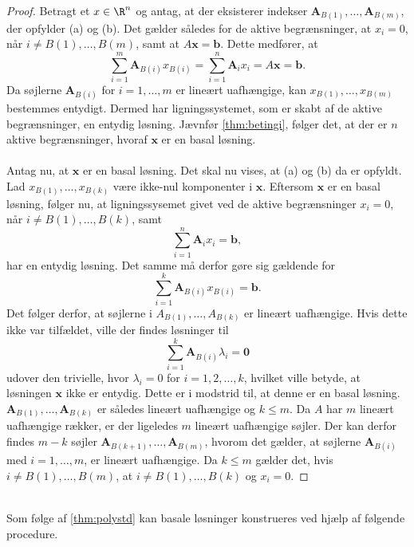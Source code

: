 \begin{proof}
Betragt et $x \in \R^n$ og antag, at der eksisterer indekser $\mathbf{A}_{B(1)},\ldots,\mathbf{A}_{B(m)}$, der opfylder (a) og (b).
%
Det gælder således for de aktive begrænsninger, at $x_i=0$, når $i\neq B(1),\ldots,B(m)$, samt at $A\textbf{x}=\mathbf{b}$.
Dette medfører, at 
%
$$\sum_{i=1}^{m}\textbf{A}_{B(i)}x_{B(i)}=\sum_{i=1}^{n}\textbf{A}_ix_i=A\textbf{x}=\textbf{b}.$$
%
Da søjlerne $\textbf{A}_{B(i)}$ for $i=1,\ldots,m$ er lineært uafhængige, kan $x_{B(1)},\ldots,x_{B(m)}$ bestemmes entydigt. 
Dermed har ligningssystemet, som er skabt af de aktive begrænsninger, en entydig løsning.
Jævnfør \ref{thm:betingi},
følger det, at der er $n$ aktive begrænsninger, hvoraf $\mathbf{x}$ er en basal løsning. 
\\\\
%
%
Antag nu, at $\mathbf{x}$ er en basal løsning. 
Det skal nu vises, at (a) og (b) da er opfyldt.
Lad $x_{B(1)},\ldots,x_{B(k)}$ være ikke-nul komponenter i $\textbf{x}$.
Eftersom $\mathbf{x}$ er en basal løsning, følger nu, at ligningssysemet givet ved de aktive begrænsninger $x_i=0$, når $i\neq B(1),\ldots,B(k)$, samt  $$\sum_{i=1}^{n}\mathbf{A}_i x_i=\mathbf{b},$$ har en entydig løsning. 
Det samme må derfor gøre sig gældende for $$\sum_{i=1}^{k}\mathbf{A}_{B(i)}x_{B(i)}=\mathbf{b}.$$
Det følger derfor, at søjlerne i $A_{B(1)},\ldots,A_{B(k)}$ er lineært uafhængige.
%
Hvis dette ikke var tilfældet, ville der findes løsninger til $$\sum_{i=1}^{k}\mathbf{A}_{B(i)} \lambda_i=\mathbf{0}$$ udover den trivielle, hvor $\lambda_i=0$ for $i=1,2,\ldots,k$, hvilket ville betyde, at løsningen $\mathbf{x}$ ikke er entydig. 
Dette er i modstrid til, at denne er en basal løsning.
$\mathbf{A}_{B(1)},\ldots ,\mathbf{A}_{B(k)}$ er således lineært uafhængige og $k \leq m$.
Da $A$ har $m$ lineært uafhængige rækker, er der ligeledes $m$ lineært uafhængige søjler.
Der kan derfor findes $m-k$ søjler $\textbf{A}_{B(k+1)},\ldots,\textbf{A}_{B(m)}$, hvorom det gælder, at søjlerne $\mathbf{A}_{B(i)}$ med $i=1,\ldots,m$, er lineært uafhængige.
Da $k \leq m$ gælder det, hvis $i \neq B(1),\ldots,B(m)$, at $i \neq B(1),\ldots,B(k)$ og $x_i=0$.
%
\end{proof}
\\
\noindent
Som følge af \ref{thm:polystd} kan basale løsninger konstrueres ved hjælp af følgende procedure.
